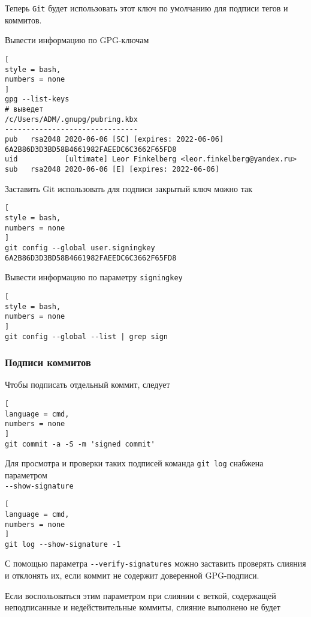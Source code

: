 \documentclass[%
	11pt,
	a4paper,
	utf8,
		]{article}
\begin{document}
Теперь \texttt{Git} будет использовать этот ключ по умолчанию для подписи тегов и коммитов.

Вывести информацию по GPG-ключам
\begin{lstlisting}[
style = bash,
numbers = none
]
gpg --list-keys
# выведет
/c/Users/ADM/.gnupg/pubring.kbx
-------------------------------
pub   rsa2048 2020-06-06 [SC] [expires: 2022-06-06]
6A2B86D3D3BD58B4661982FAEEDC6C3662F65FD8
uid           [ultimate] Leor Finkelberg <leor.finkelberg@yandex.ru>
sub   rsa2048 2020-06-06 [E] [expires: 2022-06-06]
\end{lstlisting}

Заставить Git использовать для подписи закрытый ключ можно так
\begin{lstlisting}[
style = bash,
numbers = none
]
git config --global user.signingkey 6A2B86D3D3BD58B4661982FAEEDC6C3662F65FD8
\end{lstlisting}

Вывести информацию по параметру \texttt{signingkey}
\begin{lstlisting}[
style = bash,
numbers = none	
]
git config --global --list | grep sign
\end{lstlisting}

\subsubsection{Подписи коммитов}

Чтобы подписать отдельный коммит, следует

\begin{lstlisting}[
language = cmd,
numbers = none
]
git commit -a -S -m 'signed commit'
\end{lstlisting}

Для просмотра и проверки таких подписей команда \texttt{git log} снабжена параметром \\\mbox{\lstinline{--show-signature}}

\begin{lstlisting}[
language = cmd,
numbers = none
]
git log --show-signature -1
\end{lstlisting}

С помощью параметра \lstinline{--verify-signatures} можно заставить проверять слияния и отклонять их, если коммит не содержит доверенной GPG-подписи.

Если воспольоваться этим параметром при слиянии с веткой, содержащей неподписанные и недействительные коммиты, слияние выполнено не будет
\end{document}
